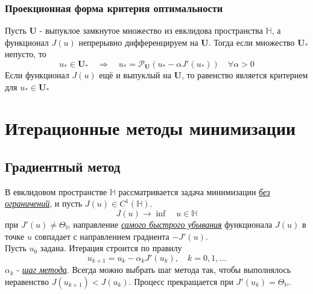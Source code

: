 \documentclass[A4]{article}
\begin{document}
\subsubsection{Проекционная форма критерия оптимальности}
Пусть $\mathbf{U}$ - выпуклое замкнутое множество из евклидова пространства $\mathbb{H}$, а функционал $J(u)$ непрерывно дифференцируем на $\mathbf{U}$. Тогда если множество $\mathbf{U}_*$ непусто, то 
\begin{equation*}
u_*\in \mathbf{U}_*\quad\Rightarrow\quad u_*=\mathcal{P}_{\mathbf{U}}(u_*-\alpha J'(u_*))\quad\forall\alpha >0
\end{equation*}
Если функционал $J(u)$ ещё и выпуклый на $\mathbf{U}$, то равенство является критерием для $u_*\in\mathbf{U}_*$
\section{Итерационные методы минимизации}
\subsection{Градиентный метод}
В евклидовом пространстве $\mathbb{H}$ рассматривается задача минимизации \underline{\emph{без ограничений}}, и пусть $J(u)\in C^1(\mathbb{H}).$
\begin{equation*}
J(u)\rightarrow \inf\quad u\in\mathbb{H}
\end{equation*}
при $J'(u)\ne\Theta_{\mathbb{H}}$ направление \underline{\emph{самого быстрого убывания}} функционала $J(u)$ в точке $u$ совпадает с направлением градиента $-J'(u)$.\\
Пусть $u_0$ задана. Итерация строится по правилу 
\begin{equation*}
u_{k+1}=u_k-\alpha_k J'(u_k),\quad k=0,1,\ldots
\end{equation*}
$\alpha_k$ - \underline{\emph{шаг метода}}. Всегда можно выбрать шаг метода так, чтобы выполнялось неравенство $J(u_{k+1})<J(u_k)$. Процесс прекращается при $J'(u_k)=\Theta_{\mathbb{H}}$.
\end{document}
